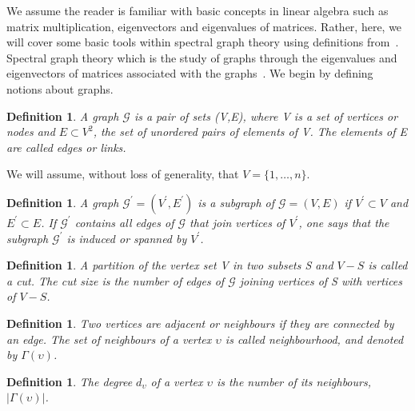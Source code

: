 \documentclass[12pt]{article}
\numberwithin{equation}{section}
\newtheorem{definition}[theorem]{Definition}
\begin{document}
We assume the reader is familiar with basic concepts in linear algebra such as matrix multiplication, eigenvectors and eigenvalues of matrices. Rather, here, we will cover some basic tools within spectral graph theory using definitions from~\cite{For10,New06a, Spi12, Spi07}. Spectral graph theory which is the study of graphs through the eigenvalues and eigenvectors of matrices associated with the graphs~\cite{Spi12}. We begin by defining notions about graphs.
\begin{definition}
\label{def:graph}
	A graph $\mathcal{G}$ is a pair of sets (V,E), where V is a set of vertices or nodes and $E \subset V^{2}$, the set of unordered pairs of elements of V. The elements of E are called edges or links.
\end{definition}
We will assume, without loss of generality, that $V = \{1,\dots,n\}$.
\begin{definition}
\label{def:subGraph}
	A graph $\mathcal{G}^{\prime} = (V^{\prime},E^{\prime})$ is a subgraph of $\mathcal{G} = (V,E)$ if $V^{\prime} \subset V$ and $E^{\prime} \subset E$. If $\mathcal{G}^{\prime}$ contains all edges of $\mathcal{G}$ that join vertices of $V^{\prime}$, one says that the subgraph $\mathcal{G}^{\prime}$ is induced or spanned by $V^{\prime}$.
\end{definition}
\begin{definition}
\label{def:cuts}
	A partition of the vertex set V in two subsets S and $V-S$ is called a cut. The cut size is the number of edges of $\mathcal{G}$ joining vertices of S with vertices of $V-S$.
\end{definition}
\begin{definition}
\label{def:neighbourhoodNode}
	Two vertices are adjacent or neighbours if they are connected by an edge. The set of neighbours of a vertex $\upsilon$ is called neighbourhood, and denoted by $\Gamma(\upsilon)$.
\end{definition}
\begin{definition}
\label{def:degreeNode}
	The degree $d_{\upsilon}$ of a vertex $\upsilon$ is the number of its neighbours, $\left\vert{\Gamma(\upsilon)}\right\vert$.
\end{definition}
\end{document}
